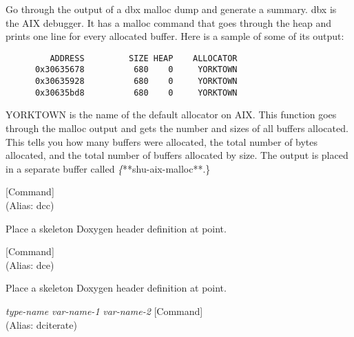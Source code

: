 \begin{doc-string}
Go through the output of a dbx malloc dump and generate a summary.  dbx is
the AIX debugger.  It has a malloc command that goes through the heap and prints
one line for every allocated buffer.  Here is a sample of some of its output:

\small{\begin{verbatim}
         ADDRESS         SIZE HEAP    ALLOCATOR
      0x30635678          680    0     YORKTOWN
      0x30635928          680    0     YORKTOWN
      0x30635bd8          680    0     YORKTOWN
\end{verbatim}}

YORKTOWN is the name of the default allocator on AIX.  This function goes
through the malloc output and gets the number and sizes of all buffers
allocated.  This tells you how many buffers were allocated, the total number of
bytes allocated, and the total number of buffers allocated by size.  The output
is placed in a separate buffer called \emph\{**shu-aix-malloc**.\}
\end{doc-string}

\vspace{1em}
\noindent
{}
\usebox{\funcname}
 \hfill [Command]\\%
 (Alias: dcc)

\begin{doc-string}
Place a skeleton Doxygen header definition at point.
\end{doc-string}

\vspace{1em}
\noindent
{}
\usebox{\funcname}
 \hfill [Command]\\%
 (Alias: dce)

\begin{doc-string}
Place a skeleton Doxygen header definition at point.
\end{doc-string}

\vspace{1em}
\noindent
{}
\usebox{\funcname}\emph{type-name} \emph{var-name-1} \emph{var-name-2}
 \hfill [Command]\\%
 (Alias: dciterate)

